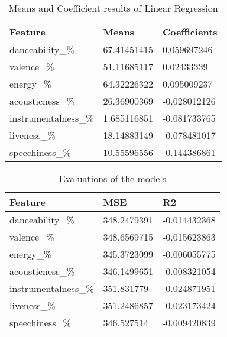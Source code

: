 \documentclass[titlepage]{article}
\begin{document}
\begin{table}[H]
    \centering 
    \caption{Means and Coefficient results of Linear Regression}
    \begin{tabular}{lll}
    \hline
        Feature & Means & Coefficients \\ \hline
        danceability\_\% & 67.41451415 & 0.059697246 \\ 
        valence\_\% & 51.11685117 & 0.02433339 \\ 
        energy\_\% & 64.32226322 & 0.095009237 \\ 
        acousticness\_\% & 26.36900369 & -0.028012126 \\ 
        instrumentalness\_\% & 1.685116851 & -0.081733765 \\ 
        liveness\_\% & 18.14883149 & -0.078481017 \\ 
        speechiness\_\% & 10.55596556 & -0.144386861 \\ \hline
    \end{tabular}
\end{table}
\begin{table}[H]
    \centering 
    \caption{Evaluations of the models}
    \begin{tabular}{lll}
    \hline
        Feature & MSE & R2 \\ \hline
        danceability\_\% & 348.2479391 & -0.014432368 \\ 
        valence\_\% & 348.6569715 & -0.015623863 \\ 
        energy\_\% & 345.3723099 & -0.006055775 \\ 
        acousticness\_\% & 346.1499651 & -0.008321054 \\ 
        instrumentalness\_\% & 351.831779 & -0.024871951 \\ 
        liveness\_\% & 351.2486857 & -0.023173424 \\ 
        speechiness\_\% & 346.527514 & -0.009420839 \\ \hline
    \end{tabular}
\end{table} 
\end{document}

